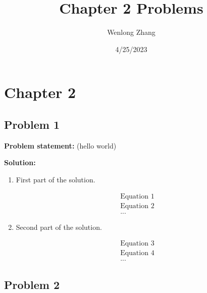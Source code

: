 \documentclass[12pt]{article}
\title{Chapter 2 Problems}
\author{Wenlong Zhang}
\date{4/25/2023}
\begin{document}
\maketitle

\section*{Chapter 2}

\subsection*{Problem 1}

\textbf{Problem statement:} (hello world)

\textbf{Solution:}

\begin{enumerate}[label=\alph*)]
    \item First part of the solution.

    \begin{align*}
        \text{Equation 1} \\
        \text{Equation 2} \\
        \text{...}
    \end{align*}

    \item Second part of the solution.

    \begin{align*}
        \text{Equation 3} \\
        \text{Equation 4} \\
        \text{...}
    \end{align*}

\end{enumerate}

\subsection*{Problem 2}

\end{document}
